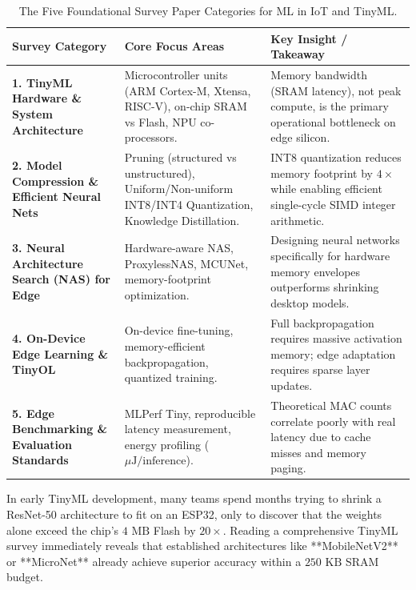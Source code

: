 \begin{table}[htbp]
\centering
\small
\begin{tabular}{p{3.2cm}p{4.2cm}p{5.5cm}}
\toprule
\textbf{Survey Category} & \textbf{Core Focus Areas} & \textbf{Key Insight / Takeaway} \\
\midrule
\textbf{1. TinyML Hardware \& System Architecture} & Microcontroller units (ARM Cortex-M, Xtensa, RISC-V), on-chip SRAM vs Flash, NPU co-processors. & Memory bandwidth (SRAM latency), not peak compute, is the primary operational bottleneck on edge silicon. \\
\midrule
\textbf{2. Model Compression \& Efficient Neural Nets} & Pruning (structured vs unstructured), Uniform/Non-uniform INT8/INT4 Quantization, Knowledge Distillation. & INT8 quantization reduces memory footprint by $4\times$ while enabling efficient single-cycle SIMD integer arithmetic. \\
\midrule
\textbf{3. Neural Architecture Search (NAS) for Edge} & Hardware-aware NAS, ProxylessNAS, MCUNet, memory-footprint optimization. & Designing neural networks specifically for hardware memory envelopes outperforms shrinking desktop models. \\
\midrule
\textbf{4. On-Device Edge Learning \& TinyOL} & On-device fine-tuning, memory-efficient backpropagation, quantized training. & Full backpropagation requires massive activation memory; edge adaptation requires sparse layer updates. \\
\midrule
\textbf{5. Edge Benchmarking \& Evaluation Standards} & MLPerf Tiny, reproducible latency measurement, energy profiling ($\mu\text{J}/\text{inference}$). & Theoretical MAC counts correlate poorly with real latency due to cache misses and memory paging. \\
\bottomrule
\end{tabular}
\caption{The Five Foundational Survey Paper Categories for ML in IoT and TinyML.}\label{tab:survey_papers}
\end{table}

\begin{iotbox}
In early TinyML development, many teams spend months trying to shrink a ResNet-50 architecture to fit on an ESP32, only to discover that the weights alone exceed the chip's $4\text{ MB}$ Flash by $20\times$. Reading a comprehensive TinyML survey immediately reveals that established architectures like **MobileNetV2** or **MicroNet** already achieve superior accuracy within a $250\text{ KB}$ SRAM budget.
\end{iotbox}

